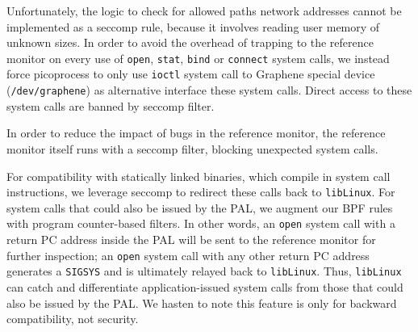 Unfortunately, the logic to check for allowed paths network addresses cannot be implemented 
as a seccomp rule, because it involves reading user memory of unknown sizes. 
In order to avoid the overhead of trapping to the reference monitor on 
every use of {\tt open}, {\tt stat}, {\tt bind} or {\tt connect} system calls, we instead 
force picoprocess to only use {\tt ioctl} system call to Graphene special device ({\tt /dev/graphene}) as alternative interface these system calls. Direct access to these system calls are banned by seccomp filter.

In order to reduce the impact of bugs in the reference monitor,
the reference monitor itself runs with a seccomp filter,
blocking unexpected system calls.

\vspace{5pt}
For compatibility with statically linked binaries, which 
compile in system call instructions,
we leverage seccomp to redirect these calls 
back to {\tt libLinux}.  
For system calls that could also be issued by the PAL,
we augment our BPF rules with program counter-based filters.
In other words, an {\tt open} system call with a return PC address inside the PAL 
will be sent to the reference monitor for further inspection;
an {\tt open} system call with any other return PC address generates 
a {\tt SIGSYS} and is ultimately relayed back to {\tt libLinux}.
Thus, {\tt libLinux} can catch and differentiate application-issued system calls
from those that could also be issued by the PAL.
We hasten to note this feature is only for backward compatibility,
not security. 


\begin{comment}
We hasten to note that program counter filtering
is only provided for backwards compatibility, not security.
An attacker can compromise the PAL, so system policies are enforced
externally by the reference monitor.


Dynamically redirecting system calls to {\tt libLinux} is 
less efficient than dynamically linking against
the Graphene libc or statically compiling {\tt libLinux} into the application.
The overhead of dynamic redirection comes from 
transferring control to the kernel, then back to 
the PAL, and then to {\tt libLinux}.
We leave exploration of more efficient alternatives for future work,
such as redirecting the hardware system call table to {\tt libLinux}
on a host system like Dune~\cite{belay12dune},
or dynamically rewriting parts of the static binary~\cite{hunt99detours}.
\end{comment}

